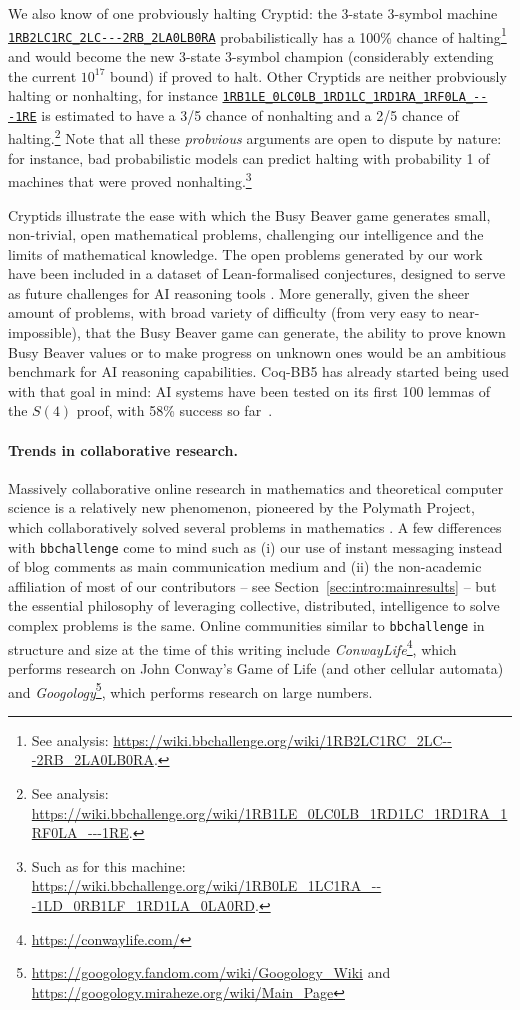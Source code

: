 \documentclass[a4paper,british]{article}
\theoremstyle{definition} %
\numberwithin{equation}{section}
\theoremstyle{definition} %
\newcommand{\tm}[1]{\href{https://bbchallenge.org/#1}{\texttt{\nolinkurl{#1}}}}
\newcommand{\CoqBB}{Coq-BB5\xspace}
\begin{document}
We also know of one probviously halting Cryptid: the 3-state 3-symbol machine \tm{1RB2LC1RC_2LC---2RB_2LA0LB0RA} probabilistically has a 100\% chance of halting\footnote{See analysis: {\scriptsize \url{https://wiki.bbchallenge.org/wiki/1RB2LC1RC_2LC---2RB_2LA0LB0RA}}.} and would become the new 3-state 3-symbol champion (considerably extending the current $10^{17}$ bound) if proved to halt. Other Cryptids are neither probviously halting or nonhalting, for instance \tm{1RB1LE_0LC0LB_1RD1LC_1RD1RA_1RF0LA_---1RE} is estimated to have a 3/5 chance of nonhalting and a 2/5 chance of halting.\footnote{See analysis: {\scriptsize \url{https://wiki.bbchallenge.org/wiki/1RB1LE_0LC0LB_1RD1LC_1RD1RA_1RF0LA_---1RE}}.} Note that all these \textit{probvious} arguments are open to dispute by nature: for instance, bad probabilistic models can predict halting with probability 1 of machines that were proved nonhalting.\footnote{Such as for this machine: \url{https://wiki.bbchallenge.org/wiki/1RB0LE_1LC1RA_---1LD_0RB1LF_1RD1LA_0LA0RD}.}

Cryptids illustrate the ease with which the Busy Beaver game generates small, non-trivial, open mathematical problems, challenging our intelligence and the limits of mathematical knowledge. The open problems generated by our work have been included in a dataset of Lean-formalised conjectures, designed to serve as future challenges for AI reasoning tools \cite{google-deepmind-formal-conjectures}. More generally, given the sheer amount of problems, with broad variety of difficulty (from very easy to near-impossible), that the Busy Beaver game can generate, the ability to prove known Busy Beaver values or to make progress on unknown ones would be an ambitious benchmark for AI reasoning capabilities. \CoqBB has already started being used with that goal in mind: AI systems have been tested on its first 100 lemmas of the $S(4)$ proof, with 58\% success so far~\cite{teodorescu2024nlir}.

\paragraph{Trends in collaborative research.} Massively collaborative online research in mathematics and theoretical computer science is a relatively new phenomenon, pioneered by the Polymath Project, which collaboratively solved several problems in mathematics \cite{Gowers2009}. A few differences with \texttt{bbchallenge} come to mind such as (i) our use of instant messaging instead of blog comments as main communication medium and (ii) the non-academic affiliation of most of our contributors -- see Section~\ref{sec:intro:mainresults} -- but the essential philosophy of leveraging collective, distributed, intelligence to solve complex problems is the same. Online communities similar to \texttt{bbchallenge} in structure and size at the time of this writing include \textit{ConwayLife}\footnote{\url{https://conwaylife.com/}}, which performs research on John Conway's Game of Life (and other cellular automata) and \textit{Googology}\footnote{\url{https://googology.fandom.com/wiki/Googology_Wiki} and \url{https://googology.miraheze.org/wiki/Main_Page}}, which performs research on large numbers.
\end{document}
